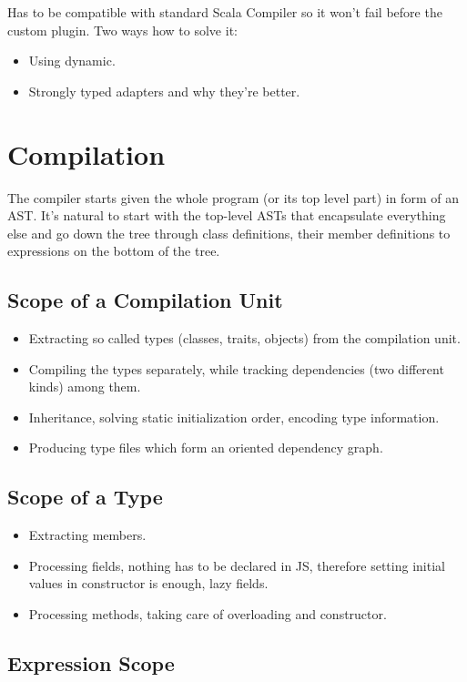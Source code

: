 \documentclass[12pt,a4paper]{report}
\begin{document}
Has to be compatible with standard Scala Compiler so it won't fail before the custom plugin. Two ways how to solve it: 
\begin{itemize}
\item Using dynamic.
\item Strongly typed adapters and why they're better.
\end{itemize}

\section{Compilation}

The compiler starts given the whole program (or its top level part) in form of an AST. It's natural to start with the top-level ASTs that encapsulate everything else and go down the tree through class definitions, their member definitions to expressions on the bottom of the tree.

\subsection{Scope of a Compilation Unit}

\begin{itemize}
\item Extracting so called types (classes, traits, objects) from the compilation unit.
\item Compiling the types separately, while tracking dependencies (two different kinds) among them.
\item Inheritance, solving static initialization order, encoding type information.
\item Producing type files which form an oriented dependency graph.
\end{itemize}

\subsection{Scope of a Type}

\begin{itemize}
\item Extracting members.
\item Processing fields, nothing has to be declared in JS, therefore setting initial values in constructor is enough, lazy fields.
\item Processing methods, taking care of overloading and constructor.
\end{itemize}

\subsection{Expression Scope}
\end{document}
